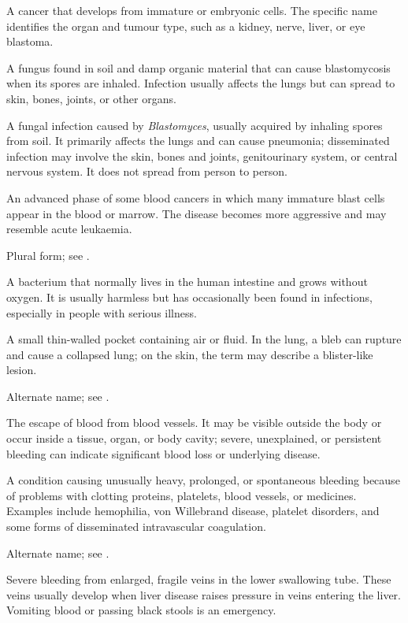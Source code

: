  A cancer that develops from immature or embryonic cells. The specific name identifies the organ and tumour type, such as a kidney, nerve, liver, or eye blastoma.

 A fungus found in soil and damp organic material that can cause blastomycosis when its spores are inhaled. Infection usually affects the lungs but can spread to skin, bones, joints, or other organs.

 A fungal infection caused by \textit{Blastomyces}, usually acquired by inhaling
spores from soil. It primarily affects the lungs and can cause pneumonia; disseminated
infection may involve the skin, bones and joints, genitourinary system, or central nervous
system. It does not spread from person to person.

 An advanced phase of some blood cancers in which many immature blast cells appear in the blood or marrow. The disease becomes more aggressive and may resemble acute leukaemia.

 Plural form; see .

 A bacterium that normally lives in the human intestine and grows without oxygen. It is usually harmless but has occasionally been found in infections, especially in people with serious illness.

 A small thin-walled pocket containing air or fluid. In the lung, a bleb can rupture and cause a collapsed lung; on the skin, the term may describe a blister-like lesion.

 Alternate name; see .

 The escape of blood from blood vessels. It may be visible outside the body or occur inside a tissue, organ, or body cavity; severe, unexplained, or persistent bleeding can indicate significant blood loss or underlying disease.

 A condition causing unusually heavy, prolonged, or spontaneous bleeding because of problems with clotting proteins, platelets, blood vessels, or medicines. Examples include hemophilia, von Willebrand disease, platelet disorders, and some forms of disseminated intravascular coagulation.

 Alternate name; see .

 Severe bleeding from enlarged, fragile veins in the lower swallowing tube. These veins usually develop when liver disease raises pressure in veins entering the liver. Vomiting blood or passing black stools is an emergency.

